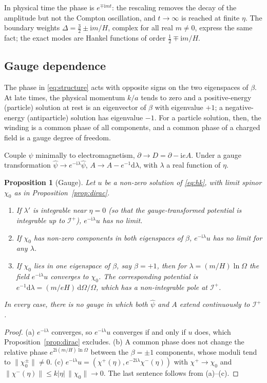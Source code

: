 \documentclass[11pt,a4paper]{article}
\newtheorem{proposition}{Proposition}
\theoremstyle{definition}
\newcommand{\scri}{\mathscr{I}^{+}}
\newcommand{\dd}{\mathrm{d}}
\newcommand{\ii}{\mathrm{i}}
\newcommand{\hpsi}{\hat\psi}
\begin{document}
In physical time the phase is $e^{\mp\ii mt}$: the rescaling removes the decay of the amplitude but not the Compton oscillation, and $t\to\infty$ is reached at finite $\eta$. The boundary weights $\Delta=\tfrac32\pm\ii m/H$, complex for all real $m\neq0$, express the same fact; the exact modes are Hankel functions of order $\tfrac12\mp\ii m/H$.

\subsection{Gauge dependence}
\label{sec:gauge}

The phase in \eqref{eq:structure} acts with opposite signs on the two eigenspaces of $\beta$. At late times, the physical momentum $k/a$ tends to zero and a positive-energy (particle) solution at rest is an eigenvector of $\beta$ with eigenvalue $+1$; a negative-energy (antiparticle) solution has eigenvalue $-1$. For a particle solution, then, the winding is a common phase of all components, and a common phase of a charged field is a gauge degree of freedom.

Couple $\psi$ minimally to electromagnetism, $\partial\to D=\partial-\ii eA$. Under a gauge transformation $\hpsi\to e^{-\ii\lambda}\hpsi$, $A\to A-e^{-1}\dd\lambda$, with $\lambda$ a real function of $\eta$.

\begin{proposition}[Gauge]
\label{prop:gauge}
Let $u$ be a non-zero solution of \eqref{eq:hk}, with limit spinor $\chi_{0}$ as in Proposition~\ref{prop:dirac}.
\begin{enumerate}[label=(\alph*)]
\item If $\lambda'$ is integrable near $\eta=0$ (so that the gauge-transformed potential is integrable up to $\scri$), $e^{-\ii\lambda}u$ has no limit.
\item If $\chi_{0}$ has non-zero components in both eigenspaces of $\beta$, $e^{-\ii\lambda}u$ has no limit for any $\lambda$.
\item If $\chi_{0}$ lies in one eigenspace of $\beta$, say $\beta=+1$, then for $\lambda=(m/H)\ln\Omega$ the field $e^{-\ii\lambda}u$ converges to $\chi_{0}$. The corresponding potential is $e^{-1}\dd\lambda=(m/eH)\,\dd\Omega/\Omega$, which has a non-integrable pole at $\scri$.
\end{enumerate}
In every case, there is no gauge in which both $\hpsi$ and $A$ extend continuously to $\scri$.
\end{proposition}
\begin{proof}
(a) $e^{-\ii\lambda}$ converges, so $e^{-\ii\lambda}u$ converges if and only if $u$ does, which Proposition~\ref{prop:dirac} excludes. (b) A common phase does not change the relative phase $e^{2\ii(m/H)\ln\Omega}$ between the $\beta=\pm1$ components, whose moduli tend to $\|\chi_{0}^{\pm}\|\neq0$. (c) $e^{-\ii\lambda}u=(\chi^{+}(\eta),e^{-2\ii\lambda}\chi^{-}(\eta))$ with $\chi^{+}\to\chi_{0}$ and $\|\chi^{-}(\eta)\|\le k|\eta|\,\|\chi_{0}\|\to0$. The last sentence follows from (a)--(c).
\end{proof}
\end{document}
